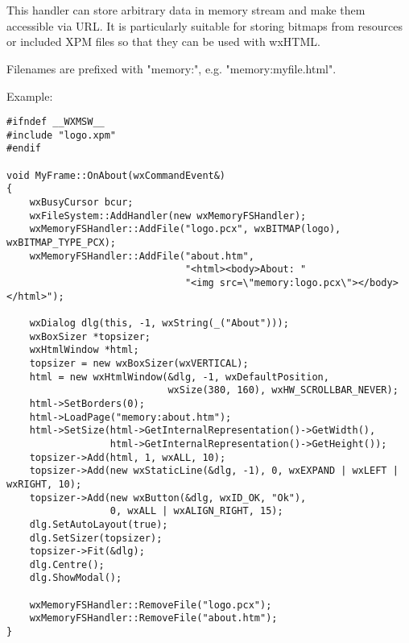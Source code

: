 %
%

\section{}\label{wxmemoryfshandler}

This  handler can store arbitrary 
data in memory stream and make them accessible via URL. It is particularly
suitable for storing bitmaps from resources or included XPM files so that
they can be used with wxHTML.

Filenames are prefixed with "memory:", e.g. "memory:myfile.html".

Example:

\begin{verbatim}
#ifndef __WXMSW__
#include "logo.xpm"
#endif

void MyFrame::OnAbout(wxCommandEvent&)
{
    wxBusyCursor bcur;
    wxFileSystem::AddHandler(new wxMemoryFSHandler);
    wxMemoryFSHandler::AddFile("logo.pcx", wxBITMAP(logo), wxBITMAP_TYPE_PCX);
    wxMemoryFSHandler::AddFile("about.htm", 
                               "<html><body>About: "
                               "<img src=\"memory:logo.pcx\"></body></html>");

    wxDialog dlg(this, -1, wxString(_("About")));
    wxBoxSizer *topsizer;
    wxHtmlWindow *html;
    topsizer = new wxBoxSizer(wxVERTICAL);
    html = new wxHtmlWindow(&dlg, -1, wxDefaultPosition, 
                            wxSize(380, 160), wxHW_SCROLLBAR_NEVER);
    html->SetBorders(0);
    html->LoadPage("memory:about.htm");
    html->SetSize(html->GetInternalRepresentation()->GetWidth(), 
                  html->GetInternalRepresentation()->GetHeight());
    topsizer->Add(html, 1, wxALL, 10);
    topsizer->Add(new wxStaticLine(&dlg, -1), 0, wxEXPAND | wxLEFT | wxRIGHT, 10);
    topsizer->Add(new wxButton(&dlg, wxID_OK, "Ok"), 
                  0, wxALL | wxALIGN_RIGHT, 15);
    dlg.SetAutoLayout(true);
    dlg.SetSizer(topsizer);
    topsizer->Fit(&dlg);
    dlg.Centre();
    dlg.ShowModal();
    
    wxMemoryFSHandler::RemoveFile("logo.pcx");
    wxMemoryFSHandler::RemoveFile("about.htm");
}
\end{verbatim}




